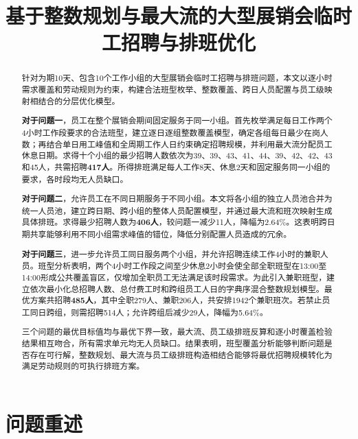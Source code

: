 \documentclass[withoutpreface,bwprint]{cumcmthesis}
\title{基于整数规划与最大流的大型展销会临时工招聘与排班优化}
\begin{document}
\maketitle

\begin{abstract}

针对为期10天、包含10个工作小组的大型展销会临时工招聘与排班问题，本文以逐小时需求覆盖和劳动规则为约束，构建合法班型枚举、整数覆盖、跨日人员配置与员工级映射相结合的分层优化模型。

\textbf{对于问题一}，员工在整个展销会期间固定服务于同一小组。首先枚举满足每日工作两个4小时工作段要求的合法班型，建立逐日逐组整数覆盖模型，确定各组每日最少在岗人数；再结合单日用工峰值和全周期工作人日约束确定招聘规模，并利用最大流分配员工休息日期。求得十个小组的最少招聘人数依次为39、39、43、41、44、39、42、42、43和45人，共需招聘\textbf{417人}。所得排班满足每人工作8天、休息2天和固定服务同一小组的要求，各时段均无人员缺口。

\textbf{对于问题二}，允许员工在不同日期服务于不同小组。本文将各小组的独立人员池合并为统一人员池，建立跨日期、跨小组的整体人员配置模型，并通过最大流和班次映射生成具体排班。求得最少招聘人数为\textbf{406人}，较问题一减少11人，降幅为2.64\%。这表明跨日期共享能够利用不同小组需求峰值的错位，降低分别配置人员造成的冗余。

\textbf{对于问题三}，进一步允许员工同日服务两个小组，并允许招聘连续工作4小时的兼职人员。班型分析表明，两个4小时工作段之间至少休息2小时会使全部全职班型在13:00至14:00形成公共覆盖盲区，仅增加全职员工无法满足该时段需求。为此引入兼职班型，建立依次最小化总招聘人数、总付费工时和跨组员工人日的字典序混合整数规划模型。最优方案共招聘\textbf{485人}，其中全职279人、兼职206人，共安排1942个兼职班次。若禁止员工同日跨组，则需招聘514人；允许跨组后减少29人，降幅为5.64\%。

三个问题的最优目标值均与最优下界一致，最大流、员工级排班反算和逐小时覆盖检验结果相互吻合，所有需求单元均无人员缺口。结果表明，班型覆盖分析能够判断问题是否存在可行解，整数规划、最大流与员工级排班构造相结合能够将最优招聘规模转化为满足劳动规则的可执行排班方案。


\end{abstract}

\clearpage

\section{问题重述}
\end{document}
